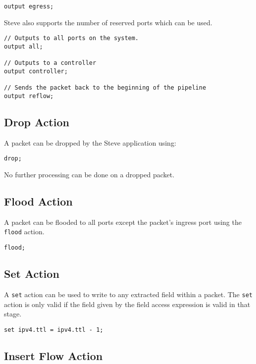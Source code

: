 \begin{lstlisting}
output egress;
\end{lstlisting}

Steve also supports the number of reserved ports which can be used.

\begin{lstlisting}[float]
// Outputs to all ports on the system.
output all; 

// Outputs to a controller
output controller; 

// Sends the packet back to the beginning of the pipeline
output reflow; 
\end{lstlisting}

\subsection{Drop Action} \label{drop_action_tut}

A packet can be dropped by the Steve application using:

\begin{lstlisting}
drop;
\end{lstlisting}

No further processing can be done on a dropped packet.

\subsection{Flood Action} \label{flood_action_tut}

A packet can be flooded to all ports except the packet's ingress port using the \texttt{flood} action.

\begin{lstlisting}
flood;
\end{lstlisting}

\subsection{Set Action} \label{set_action_tut}

A \texttt{set} action can be used to write to any extracted field within a packet. The \texttt{set} action is only valid if the field given by the field access expression is valid in that stage.

\begin{lstlisting}[float]
set ipv4.ttl = ipv4.ttl - 1;
\end{lstlisting}

\subsection{Insert Flow Action} \label{insert_flow_action_tut}

